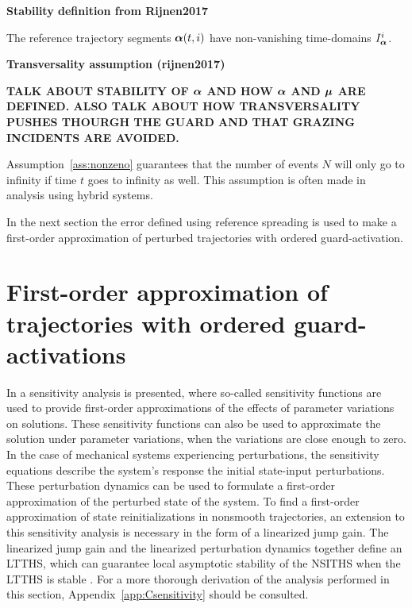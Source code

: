 \documentclass[../DC2017114Bouma.tex]{subfiles}
\begin{document}
\textbf{Stability definition from Rijnen2017}

\begin{myass}
The reference trajectory segments $\boldsymbol{\alpha}(t,i)$ have non-vanishing time-domains $I_{\boldsymbol{\alpha}}^i$.\label{ass:nonzeno}
\end{myass}

\textbf{Transversality assumption (rijnen2017)}

\textbf{TALK ABOUT STABILITY OF $\boldsymbol{\alpha}$ AND HOW $\boldsymbol{\alpha}$ AND $\boldsymbol{\mu}$ ARE DEFINED. ALSO TALK ABOUT HOW TRANSVERSALITY PUSHES THOURGH THE GUARD AND THAT GRAZING INCIDENTS ARE AVOIDED.}

Assumption~\ref{ass:nonzeno} guarantees that the number of events $N$ will only go to infinity if time $t$ goes to infinity as well. This assumption is often made in analysis using hybrid systems.

In the next section the error defined using reference spreading is used to make a first-order approximation of perturbed trajectories with ordered guard-activation.

\section{First-order approximation of trajectories with ordered guard-activations}
In \cite{Khalil1996} a sensitivity analysis is presented, where so-called sensitivity functions are used to provide first-order approximations of the effects of parameter variations on solutions. These sensitivity functions can also be used to approximate the solution under parameter variations, when the variations are close enough to zero. In the case of mechanical systems experiencing perturbations, the sensitivity equations describe the system's response the initial state-input perturbations. These perturbation dynamics can be used to formulate a first-order approximation of the perturbed state of the system. To find a first-order approximation of state reinitializations in nonsmooth trajectories, an extension to this sensitivity analysis is necessary in the form of a linearized jump gain. The linearized jump gain and the linearized perturbation dynamics together define an LTTHS, which can guarantee local asymptotic stability of the NSITHS when the LTTHS is stable \cite{Rijnen2017}. For a more thorough derivation of the analysis performed in this section, Appendix~\ref{app:Csensitivity} should be consulted.
\end{document}
